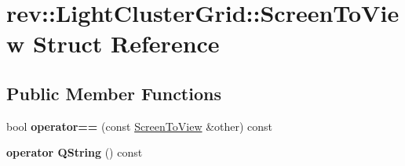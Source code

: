 \hypertarget{structrev_1_1_light_cluster_grid_1_1_screen_to_view}{}\section{rev\+::Light\+Cluster\+Grid\+::Screen\+To\+View Struct Reference}
\label{structrev_1_1_light_cluster_grid_1_1_screen_to_view}
\subsection*{Public Member Functions}
\begin{DoxyCompactItemize}
\item 
\mbox{\label{structrev_1_1_light_cluster_grid_1_1_screen_to_view_adc2f8c77c782fe9c43a161190d6ac079}} 
bool {\bfseries operator==} (const \mbox{\hyperlink{structrev_1_1_light_cluster_grid_1_1_screen_to_view}{Screen\+To\+View}} \&other) const
\item 
\mbox{\label{structrev_1_1_light_cluster_grid_1_1_screen_to_view_a9bfb5609a2dfa9a29e553c4d1e1e4a0c}} 
{\bfseries operator Q\+String} () const
\end{DoxyCompactItemize}
